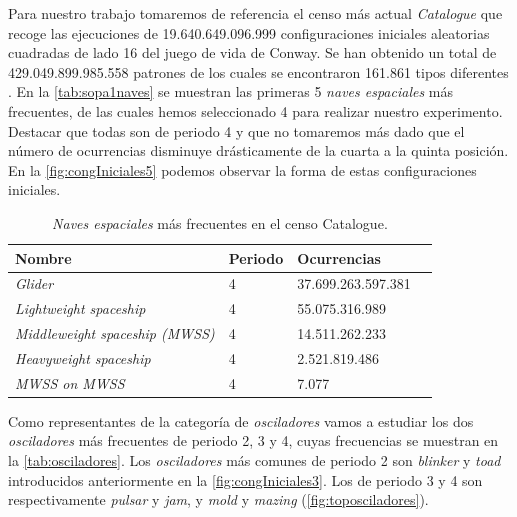 \documentclass[../proyecto.tex]{memoir}
\begin{document}
Para nuestro trabajo tomaremos de referencia el censo más actual \textit{Catalogue} que recoge las ejecuciones de 19.640.649.096.999 configuraciones iniciales aleatorias cuadradas de lado 16 del juego de vida de Conway. Se han obtenido un total de 429.049.899.985.558 patrones de los cuales se encontraron 161.861 tipos diferentes \cite{sopa3}. En la \autoref{tab:sopa1naves} se muestran las primeras 5 \textit{naves espaciales} más frecuentes, de las cuales hemos seleccionado 4 para realizar nuestro experimento. Destacar que todas son de periodo 4 y que no tomaremos más dado que el número de ocurrencias disminuye drásticamente de la cuarta a la quinta posición. En la \autoref{fig:congIniciales5} podemos observar la forma de estas configuraciones iniciales. 

\begin{table}[H]
\centering
\begin{tabular}{|l|l|l|l|}
\hline
\textbf{Nombre}                          & \textbf{Periodo} & \textbf{Ocurrencias}    \\ \hline
\textit{Glider}                 & 4       & 37.699.263.597.381 \\ \hline
\textit{Lightweight spaceship}  & 4       & 55.075.316.989     \\ \hline
\textit{Middleweight spaceship (MWSS)} & 4       & 14.511.262.233      \\ \hline
\textit{Heavyweight spaceship}  & 4       & 2.521.819.486      \\ \hline
\textit{MWSS on MWSS}  & 4       & 7.077      \\ \hline
\end{tabular}
\caption{\textit{Naves espaciales} más frecuentes en el censo {Catalogue}.}
\label{tab:sopa1naves}
\end{table}

Como representantes de la categoría de \textit{osciladores} vamos a estudiar los dos \textit{osciladores} más frecuentes de periodo 2, 3 y 4, cuyas frecuencias se muestran en la \autoref{tab:osciladores}. Los \textit{osciladores} más comunes de periodo 2 son \textit{blinker} y \textit{toad} introducidos anteriormente en la \autoref{fig:congIniciales3}. Los de periodo 3 y 4 son respectivamente \textit{pulsar} y \textit{jam}, y  \textit{mold} y \textit{mazing} (\autoref{fig:toposciladores}).
\end{document}
